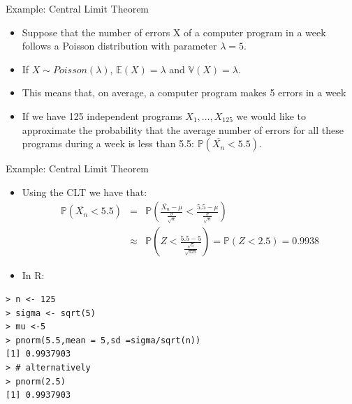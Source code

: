 \documentclass[handout]{beamer}
\begin{document}
\begin{frame}[fragile]{Example: Central Limit Theorem }
\scriptsize{
\begin{itemize}
 \item Suppose that the number of errors X of a computer program in a week follows a Poisson distribution with parameter $\lambda=5$.
 \item If $X \sim Poisson(\lambda)$, $\mathbb{E}(X)=\lambda$ and $\mathbb{V}(X)=\lambda$.
 \item This means that, on average, a computer program makes 5 errors in a week
 
 \item If we have 125 independent programs $X_{1},\dots,X_{125}$ we would like to approximate the probability that the average number of errors for all these programs during a week is less than 5.5:  $\mathbb{P}(\overline{X_{n}} < 5.5)$.



\end{itemize}






}
 
\end{frame}


\begin{frame}[fragile]{Example: Central Limit Theorem }
\scriptsize{
\begin{itemize}
 \item Using the CLT we have that:
 \begin{eqnarray*}
 \mathbb{P}(\overline{X_{n}} < 5.5) & = & \mathbb{P} \left( \frac{\overline{X_{n}}-\mu}{\frac{\sigma}{\sqrt{n}}} <  \frac{5.5 -\mu}{\frac{\sigma}{\sqrt{n}}}  \right) \nonumber \\ 
                                    & \approx & \mathbb{P}\left( Z < \frac{5.5 - 5}{\frac{\sqrt{5}}{\sqrt{125}}}  \right) = \mathbb{P}( Z < 2.5) =0.9938
\end{eqnarray*}

\item In R:

\end{itemize}

\begin{verbatim}
> n <- 125
> sigma <- sqrt(5)
> mu <-5
> pnorm(5.5,mean = 5,sd =sigma/sqrt(n))
[1] 0.9937903
> # alternatively
> pnorm(2.5)
[1] 0.9937903 
\end{verbatim}




}
 
\end{frame}
\end{document}
